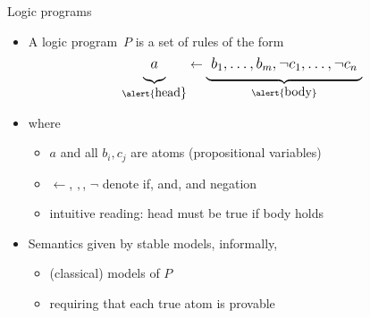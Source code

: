 \begin{frame}{Logic programs}
  \medskip
  \begin{itemize}
  \item<2->
    A \alert{logic program}~$P$ is a \alert{set of rules} of the form
    \begin{align*}\large
      \underbrace{a\raisebox{-6pt}{}}_{\text{\alert{\normalsize head}}}
      \leftarrow
      \underbrace{\raisebox{-6pt}{\ }b_1,\dots,b_m,\neg c_1,\dots,\neg c_n\raisebox{-6pt}{\ }}_{\alert{\text{\normalsize body}}}
    \end{align*}
  \item<2-> [] where
    \begin{itemize}\normalsize
    \item $a$ and all $b_i,c_j$ are \alert{atoms} (propositional variables)
    \item \alert{$\leftarrow$}, \alert{$,$}, \alert{$\neg$} denote \alert{if}, \alert{and}, and \alert{negation}
    \item intuitive reading: \alert{head} must be true \alert{if body} holds
    \end{itemize}
    \bigskip
  \item<3->
    Semantics given by \alert{stable models}, informally,
    \begin{itemize}\normalsize
    \item (classical) models of $P$
    \item requiring that each true atom is provable
    \end{itemize}
  \end{itemize}
\end{frame}
%
